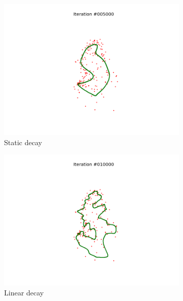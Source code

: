 \documentclass[11pt]{article}
\begin{document}
\begin{figure}
\centering
\begin{subfigure}{.33\textwidth}
  \centering
  \includegraphics[trim={6cm 2cm 6cm 2cm}, clip=true,
  width=\linewidth]{q_s.png}
  \caption{Static decay}
\end{subfigure}%
\begin{subfigure}{.33\textwidth}
  \centering
  \includegraphics[trim={6cm 2cm 6cm 2cm}, clip=true,width=\linewidth]{q_l.png}
  \caption{Linear decay}
\end{subfigure}
\begin{subfigure}{.33\textwidth}
  \centering

\end{subfigure}
\end{figure}
\end{document}
